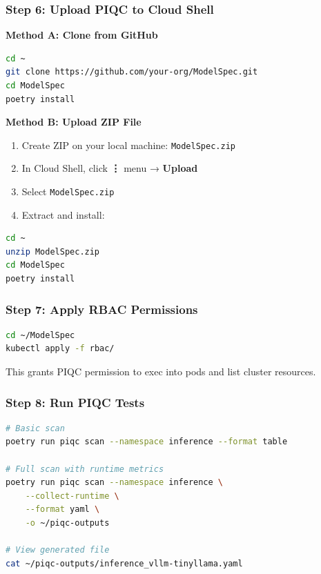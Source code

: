 \documentclass[11pt,a4paper]{article}
\begin{document}
\subsubsection{Step 6: Upload PIQC to Cloud Shell}

\textbf{Method A: Clone from GitHub}
\begin{lstlisting}[language=bash]
cd ~
git clone https://github.com/your-org/ModelSpec.git
cd ModelSpec
poetry install
\end{lstlisting}

\textbf{Method B: Upload ZIP File}
\begin{enumerate}
    \item Create ZIP on your local machine: \texttt{ModelSpec.zip}
    \item In Cloud Shell, click \textbf{⋮} menu → \textbf{Upload}
    \item Select \texttt{ModelSpec.zip}
    \item Extract and install:
\end{enumerate}

\begin{lstlisting}[language=bash]
cd ~
unzip ModelSpec.zip
cd ModelSpec
poetry install
\end{lstlisting}

\subsubsection{Step 7: Apply RBAC Permissions}

\begin{lstlisting}[language=bash]
cd ~/ModelSpec
kubectl apply -f rbac/
\end{lstlisting}

This grants PIQC permission to exec into pods and list cluster resources.

\subsubsection{Step 8: Run PIQC Tests}

\begin{lstlisting}[language=bash]
# Basic scan
poetry run piqc scan --namespace inference --format table

# Full scan with runtime metrics
poetry run piqc scan --namespace inference \
    --collect-runtime \
    --format yaml \
    -o ~/piqc-outputs

# View generated file
cat ~/piqc-outputs/inference_vllm-tinyllama.yaml
\end{lstlisting}
\end{document}
